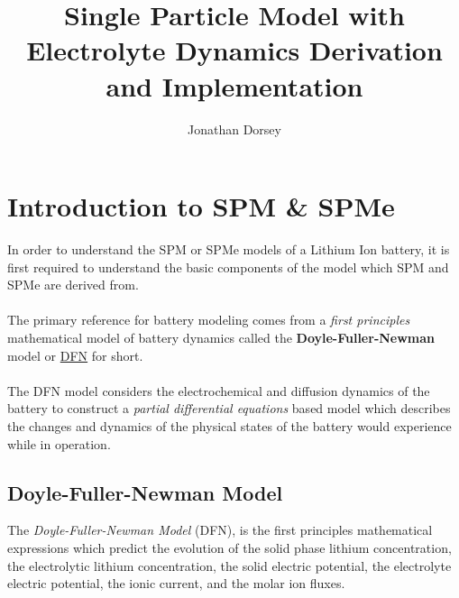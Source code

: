 \documentclass[12pt]{article}
\title{Single Particle Model with Electrolyte Dynamics Derivation and Implementation}
\author{Jonathan Dorsey}
\begin{document}
\maketitle
\pagebreak


\section{Introduction to SPM \& SPMe}
In order to understand the SPM or SPMe models of a Lithium Ion battery, it is first required to understand the basic components of the model which SPM and SPMe are derived from.

\paragraph{} The primary reference for battery modeling comes from a \textit{first principles} mathematical model of battery dynamics called the \textbf{Doyle-Fuller-Newman} model or \underline{DFN} for short.

\paragraph{} The DFN model considers the electrochemical and diffusion dynamics of the battery to construct a \textit{partial differential equations} based model which describes the changes and dynamics of the physical states of the battery would experience while in operation.

\subsection{Doyle-Fuller-Newman Model}
The \textit{Doyle-Fuller-Newman Model} (DFN), is the first principles mathematical expressions which predict the evolution of the solid phase lithium concentration, the electrolytic lithium concentration, the solid electric potential, the electrolyte electric potential, the ionic current, and the molar ion fluxes.

\vspace{.25in}
\end{document}
